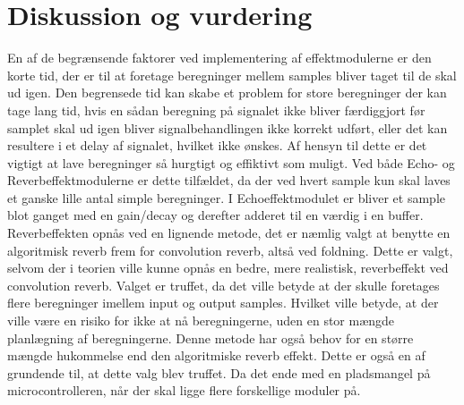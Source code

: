 \chapter{Diskussion og vurdering}\label{kap:diskussion}
\vspace*{.5cm}
 

En af de begrænsende faktorer ved implementering af effektmodulerne er den korte tid, der er til at foretage beregninger mellem samples bliver taget til de skal ud igen.
Den begrensede tid kan skabe et problem for store beregninger der kan tage lang tid, hvis en sådan beregning på signalet ikke bliver færdiggjort før samplet skal ud igen bliver signalbehandlingen ikke korrekt udført, eller det kan resultere i et delay af signalet, hvilket ikke ønskes. 
Af hensyn til dette er det vigtigt at lave beregninger så hurgtigt og effiktivt som muligt.
Ved både Echo- og Reverbeffektmodulerne er dette tilfældet, da der ved hvert sample kun skal laves et ganske lille antal simple beregninger.
I Echoeffektmodulet er bliver et sample blot ganget med en gain/decay  og derefter adderet til en værdig i en buffer.
Reverbeffekten opnås ved en lignende metode, det er næmlig valgt at benytte en algoritmisk reverb frem for convolution reverb, altså ved foldning.
Dette er valgt, selvom der i teorien ville kunne opnås en bedre, mere realistisk, reverbeffekt ved convolution reverb.
Valget er truffet, da det ville betyde at der skulle foretages flere beregninger imellem input og output samples.
Hvilket ville betyde, at der ville være en risiko for ikke at nå beregningerne, uden en stor mængde planlægning af beregningerne.
Denne metode har også behov for en større mængde hukommelse end den algoritmiske reverb effekt.
Dette er også en af grundende til, at dette valg blev truffet. 
Da det ende med en pladsmangel på microcontrolleren, når der skal ligge flere forskellige moduler på.
